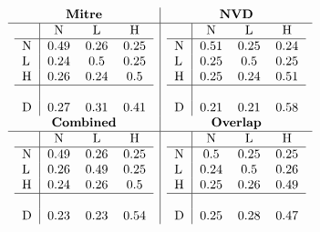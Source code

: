 \documentclass[11pt]{article}
\begin{document}
\begin{table}
	\centering
	\caption{Confusion matrices confidentialityImpact}
	\label{table:mitre-confidentialityImpact}
	\[
		\begin{array}{c|c}
			\textbf{Mitre}    & \textbf{NVD}     \\
			\hline
			\begin{tabular}{l|ccc}
				  & N    & L    & H    \\
				\hline
				N & 0.49 & 0.26 & 0.25 \\
				L & 0.24 & 0.5  & 0.25 \\
				H & 0.26 & 0.24 & 0.5  \\
				\hline                 \\
				D & 0.27 & 0.31 & 0.41 \\
			\end{tabular}
			                  &
			\begin{tabular}{l|ccc}
				  & N    & L    & H    \\
				\hline
				N & 0.51 & 0.25 & 0.24 \\
				L & 0.25 & 0.5  & 0.25 \\
				H & 0.25 & 0.24 & 0.51 \\
				\hline                 \\
				D & 0.21 & 0.21 & 0.58 \\
			\end{tabular}
			\\
			\textbf{Combined} & \textbf{Overlap} \\
			\hline
			\begin{tabular}{l|ccc}
				  & N    & L    & H    \\
				\hline
				N & 0.49 & 0.26 & 0.25 \\
				L & 0.26 & 0.49 & 0.25 \\
				H & 0.24 & 0.26 & 0.5  \\
				\hline                 \\
				D & 0.23 & 0.23 & 0.54 \\
			\end{tabular}
			                  &
			\begin{tabular}{l|ccc}
				  & N    & L    & H    \\
				\hline
				N & 0.5  & 0.25 & 0.25 \\
				L & 0.24 & 0.5  & 0.26 \\
				H & 0.25 & 0.26 & 0.49 \\
				\hline                 \\
				D & 0.25 & 0.28 & 0.47 \\
			\end{tabular}
		\end{array}
	\]
\end{table}
\end{document}
